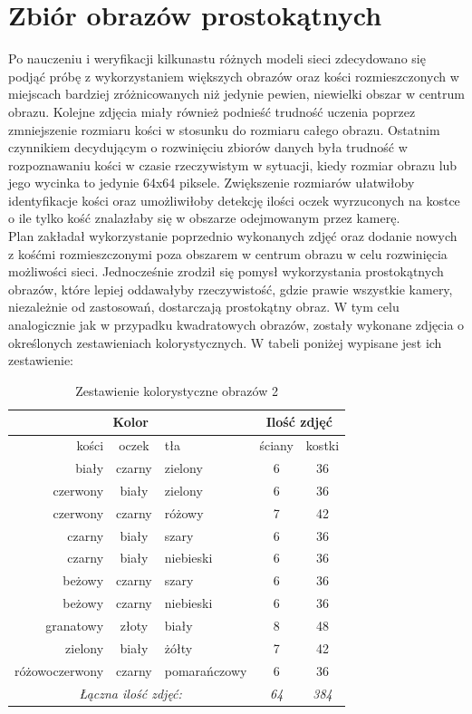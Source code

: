 \section{Zbiór obrazów prostokątnych}

Po nauczeniu i weryfikacji kilkunastu różnych modeli sieci zdecydowano się podjąć
próbę z wykorzystaniem większych obrazów oraz kości rozmieszczonych w miejscach
bardziej zróżnicowanych niż jedynie pewien, niewielki obszar w centrum obrazu.
Kolejne zdjęcia miały również podnieść trudność uczenia poprzez zmniejszenie
rozmiaru kości w stosunku do rozmiaru całego obrazu. Ostatnim czynnikiem decydującym o
rozwinięciu zbiorów danych była trudność w rozpoznawaniu kości w czasie rzeczywistym
w sytuacji, kiedy rozmiar obrazu lub jego wycinka to jedynie 64x64 piksele. Zwiększenie
rozmiarów ułatwiłoby identyfikacje kości oraz umożliwiłoby detekcję ilości oczek
wyrzuconych na kostce o ile tylko kość znalazłaby się w obszarze odejmowanym przez kamerę. \\
Plan zakładał wykorzystanie poprzednio wykonanych zdjęć oraz dodanie nowych
z kośćmi rozmieszczonymi poza obszarem w centrum obrazu w celu rozwinięcia możliwości sieci.
Jednocześnie zrodził się pomysł wykorzystania prostokątnych obrazów, które lepiej oddawałyby
rzeczywistość, gdzie prawie wszystkie kamery, niezależnie od zastosowań, dostarczają
prostokątny obraz. W tym celu analogicznie jak w przypadku kwadratowych obrazów,
zostały wykonane zdjęcia o określonych zestawieniach kolorystycznych. W tabeli poniżej
wypisane jest ich zestawienie:

\begin{table}[h!]
\centering
\begin{tabular}{rcl|cc}
\multicolumn{3}{c}{Kolor} & \multicolumn{2}{c}{Ilość zdjęć} \\ \hline
kości & oczek & tła & ściany & kostki \\ \hline
biały & czarny & zielony & 6 & 36 \\
czerwony & biały & zielony & 6 & 36 \\
czerwony & czarny & różowy & 7 & 42 \\
czarny & biały & szary & 6 & 36 \\
czarny & biały & niebieski & 6 & 36 \\
beżowy & czarny & szary & 6 & 36 \\
beżowy & czarny & niebieski & 6 & 36 \\
granatowy & złoty & biały & 8 & 48 \\
zielony & biały & żółty & 7 & 42 \\
różowoczerwony & czarny & pomarańczowy & 6 & 36 \\ \hline
\multicolumn{3}{c}{\textit{Łączna ilość zdjęć:}} & \textit{64} & \textit{384}
\end{tabular}
\vspace{0.2cm}
\caption{Zestawienie kolorystyczne obrazów 2}
\label{tab:zestawienie2}
\end{table}

